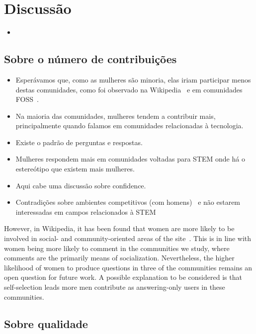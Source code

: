 \chapter{Discussão}

\begin{itemize}
	\item
\end{itemize}

\section{Sobre o número de contribuições}

\begin{itemize}
	\item Esperávamos que, como as mulheres são minoria, elas iriam participar menos destas comunidades, como foi observado na Wikipedia~\cite{antin2011gender} e em comunidades FOSS~\cite{rustad2011suck}.
	\item Na maioria das comunidades, mulheres tendem a contribuir mais, principalmente quando falamos em comunidades relacionadas à tecnologia.
	\item Existe o padrão de perguntas e respostas. 
	\item Mulheres respondem mais em comunidades voltadas para STEM onde há o estereótipo que existem mais mulheres.
	\item Aqui cabe uma discussão sobre confidence. %
	\item Contradições sobre ambientes competitivos (com homens)~\cite{gneezy2003performance} e não estarem interessadas em campos relacionados à STEM
\end{itemize}
However, in Wikipedia, it has been found that women are more likely to be involved in social- and community-oriented areas of the site~\cite{lam2011wp}. This is in line with women being more likely to comment in the communities we study, where comments are the primarily means of socialization. Nevertheless, the higher likelihood of women to produce questions in three of the communities remains an open question for future work. A possible explanation to be considered is that self-selection leads more men contribute as answering-only users in these communities.

\section{Sobre qualidade}

